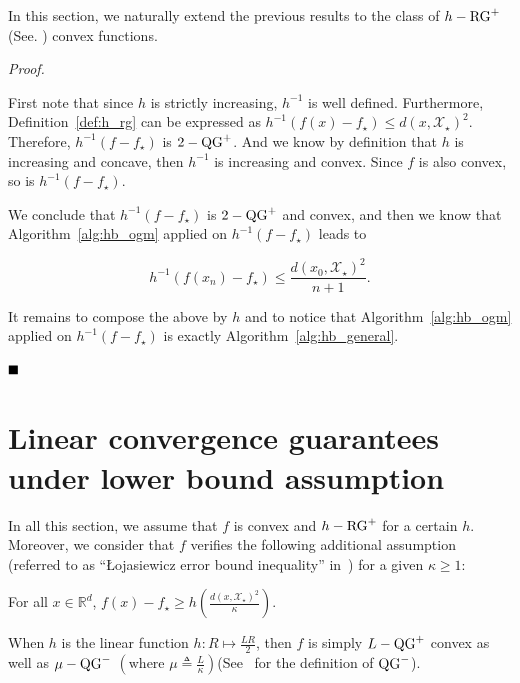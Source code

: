     In this section, we naturally extend the previous results to the class of $h-\operatorname{RG}^+$ (See. ) convex functions.

    \hbgeneral*

    \noindent \textit{Proof.}

        First note that since $h$ is strictly increasing, $h^{-1}$ is well defined.
        Furthermore, Definition~\ref{def:h_rg} can be expressed as
        $h^{-1}\left(f(x)-f_\star\right) \leq d(x, \mathcal{X}_\star)^2.$
        Therefore, $h^{-1}\left(f-f_\star\right)$ is $2-\operatorname{QG}^+$.
        And we know by definition that $h$ is increasing and concave, then $h^{-1}$ is increasing and convex.
        Since $f$ is also convex, so is $h^{-1}\left(f-f_\star\right)$.

        We conclude that $h^{-1}\left(f-f_\star\right)$ is $2-\operatorname{QG}^+$ and convex, and then we know that Algorithm~\ref{alg:hb_ogm} applied on $h^{-1}\left(f-f_\star\right)$ leads to

        \begin{equation*}
            h^{-1}\left(f(x_n) - f_\star\right) \leq \frac{d(x_0, \mathcal{X}_\star)^2}{n+1}.
        \end{equation*}

        It remains to compose the above by $h$ and to notice that Algorithm~\ref{alg:hb_ogm} applied on $h^{-1}\left(f-f_\star\right)$ is exactly Algorithm~\ref{alg:hb_general}.

    $\hfill\blacksquare$

\section{Linear convergence guarantees under lower bound assumption}
\label{apx:restart}

    In all this section, we assume that $f$ is convex and $h-\operatorname{RG}^+$ for a certain $h$.
    Moreover, we consider that $f$ verifies the following additional assumption (referred to as ``\L{}ojasiewicz error bound inequality'' in~\citep{bolte2017error}) for a given $\kappa \geq 1$:

    \begin{Assump}
        \label{assump:h_kappa}
        For all $x \in \mathbb{R}^d$, $f(x)-f_\star \geq h\left( \frac{ d(x, \mathcal{X}_\star)^2}{\kappa} \right)$.
    \end{Assump}

    \begin{Rem}
        When $h$ is the linear function $h: R \mapsto \frac{LR}{2}$, then $f$ is simply $L-\operatorname{QG}^+$ convex as well as $\mu-\operatorname{QG}^-$ $\left(\text{where } \mu \triangleq \frac{L}{\kappa}\right)$(See~\citep{guille2021study} for the definition of $\operatorname{QG}^-$).
    \end{Rem}

